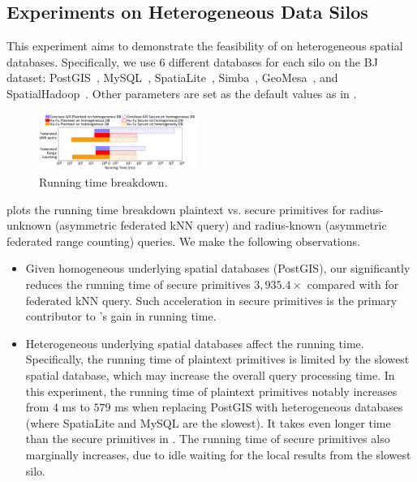 \subsection{Experiments on Heterogeneous Data Silos}
\label{subsec:exp-hete}
This experiment aims to demonstrate the feasibility of \sysname on heterogeneous spatial databases.
Specifically, we use $6$ different databases for each silo on the BJ dataset: PostGIS~\cite{postgis}, MySQL~\cite{mysql}, SpatiaLite~\cite{spatialite}, Simba~\cite{sigmod16simba}, GeoMesa~\cite{ds15geomesa}, and SpatialHadoop~\cite{icde15spatialhadoop}.
Other parameters are set as the default values as in .

\begin{figure}[t]
    \centering
    \includegraphics[width=0.46\textwidth]{database_compare.pdf}
    \caption{Running time breakdown.}
    \label{fig:database-cmp}
\end{figure}

 plots the running time breakdown \ie plaintext vs. secure primitives for radius-unknown (\ie asymmetric federated kNN query) and radius-known (\ie asymmetric federated range counting) queries.
We make the following observations.
\begin{itemize}
    \item 
    Given homogeneous underlying spatial databases (\ie PostGIS), our \sysname significantly reduces the running time of secure primitives \eg $3,935.4\times$ compared with \conclave for federated kNN query.
    Such acceleration in secure primitives is the primary contributor to \sysname's gain in running time.
    
    \item
    Heterogeneous underlying spatial databases affect the running time.
    Specifically, the running time of plaintext primitives is limited by the slowest spatial database, which may increase the overall query processing time.
    In this experiment, the running time of plaintext primitives notably increases from $4$ ms to $579$ ms when replacing PostGIS with heterogeneous databases (where SpatiaLite and MySQL are the slowest). It takes even longer time than the secure primitives in \sysname.
    The running time of secure primitives also marginally increases, due to idle waiting for the local results from the slowest silo.
\end{itemize}


